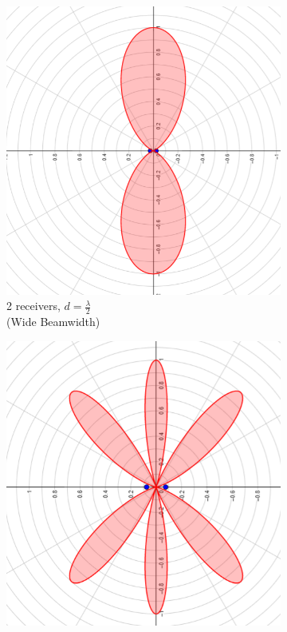 \documentclass[a4paper,twoside,12pt,hidelinks]{article}
\begin{document}
\begin{figure}[H]
\centering
\captionsetup{justification=centering}
\begin{subfigure}[H]{0.3\textwidth}
\includegraphics[width=\textwidth]{beamforming}
\caption{2 receivers, $d =\frac{\lambda}{2}$ \\(Wide Beamwidth)}
\end{subfigure}
\begin{subfigure}[H]{0.3\textwidth}
\includegraphics[width=\textwidth]{beamformingalias}

\end{subfigure}
\end{figure}
\end{document}
